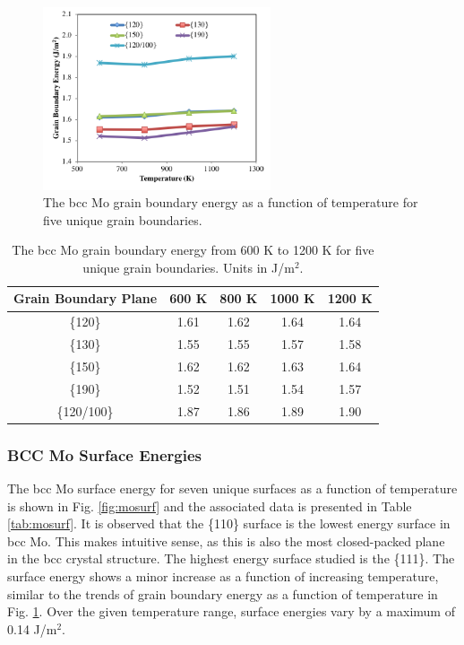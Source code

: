 \documentclass[review]{elsarticle}
\begin{document}
\begin{figure}[h]
 \centering
 \includegraphics[width=0.6\textwidth]{mo_temp.png}
 \caption{The bcc Mo grain boundary energy as a function of temperature for five unique grain boundaries.}
 \label{fig:motemp}
\end{figure}

\FloatBarrier

\begin{table}[h]
\caption{The bcc Mo grain boundary energy from 600 K to 1200 K for five unique grain boundaries. Units in J/m$^{2}$. } \label{tab:motemp}
\begin{center}
\begin{tabular}{|c|c|c|c|c|}
	\hline
	Grain Boundary Plane & 600 K & 800 K & 1000 K & 1200 K \\
	 \hline
	 \{120\} & 1.61 & 1.62 & 1.64 & 1.64 \\
	 \{130\} & 1.55 & 1.55 & 1.57 & 1.58 \\
	 \{150\} & 1.62 & 1.62 & 1.63 & 1.64 \\
	 \{190\} & 1.52 & 1.51 & 1.54 & 1.57 \\
	 \{120/100\} & 1.87 & 1.86 & 1.89 & 1.90 \\	 
	 \hline
\end{tabular}
\end{center}
\label{default}
\end{table}

\FloatBarrier

\subsubsection{BCC Mo Surface Energies}

The bcc Mo surface energy for seven unique surfaces as a function of temperature is shown in Fig. \ref{fig:mosurf} and the associated data is presented in Table \ref{tab:mosurf}. It is observed that the \{110\} surface is the lowest energy surface in bcc Mo. This makes intuitive sense, as this is also the most closed-packed plane in the bcc crystal structure. The highest energy surface studied is the \{111\}. The surface energy shows a minor increase as a function of increasing temperature, similar to the trends of grain boundary energy as a function of temperature in Fig. \ref{fig:motemp}. Over the given temperature range, surface energies vary by a maximum of 0.14 J/m$^{2}$.
\end{document}

